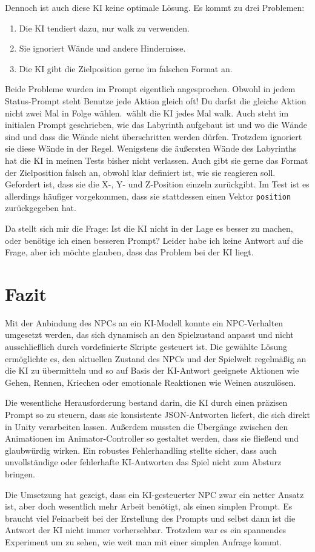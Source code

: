 \documentclass[a4paper]{article}
\begin{document}
Dennoch ist auch diese KI keine optimale Lösung. Es kommt zu drei Problemen:
\begin{enumerate}
	\item Die KI tendiert dazu, nur walk zu verwenden.
	\item Sie ignoriert Wände und andere Hindernisse.
	\item Die KI gibt die Zielposition gerne im falschen Format an.
\end{enumerate}
Beide Probleme wurden im Prompt eigentlich angesprochen. Obwohl in jedem Status-Prompt steht \glqq Benutze jede Aktion gleich oft! Du darfst die gleiche Aktion nicht zwei Mal in Folge wählen.\grqq\ wählt die KI jedes Mal walk. Auch steht im initialen Prompt geschrieben, wie das Labyrinth aufgebaut ist und wo die Wände sind und dass die Wände nicht überschritten werden dürfen. Trotzdem ignoriert sie diese Wände in der Regel. Wenigstens die äußersten Wände des Labyrinths hat die KI in meinen Tests bisher nicht verlassen. Auch gibt sie gerne das Format der Zielposition falsch an, obwohl klar definiert ist, wie sie reagieren soll. Gefordert ist, dass sie die X-, Y- und Z-Position einzeln zurückgibt. Im Test ist es allerdings häufiger vorgekommen, dass sie stattdessen einen Vektor \texttt{position} zurückgegeben hat.

Da stellt sich mir die Frage: Ist die KI nicht in der Lage es besser zu machen, oder benötige ich einen besseren Prompt? Leider habe ich keine Antwort auf die Frage, aber ich möchte glauben, dass das Problem bei der KI liegt.

\section{Fazit}
Mit der Anbindung des NPCs an ein KI-Modell konnte ein NPC-Verhalten umgesetzt werden, das sich dynamisch an den Spielzustand anpasst und nicht ausschließlich durch vordefinierte Skripte gesteuert ist. Die gewählte Lösung ermöglichte es, den aktuellen Zustand des NPCs und der Spielwelt regelmäßig an die KI zu übermitteln und so auf Basis der KI-Antwort geeignete Aktionen wie Gehen, Rennen, Kriechen oder emotionale Reaktionen wie Weinen auszulösen.

Die wesentliche Herausforderung bestand darin, die KI durch einen präzisen Prompt so zu steuern, dass sie konsistente JSON-Antworten liefert, die sich direkt in Unity verarbeiten lassen. Außerdem mussten die Übergänge zwischen den Animationen im Animator-Controller so gestaltet werden, dass sie fließend und glaubwürdig wirken. Ein robustes Fehlerhandling stellte sicher, dass auch unvollständige oder fehlerhafte KI-Antworten das Spiel nicht zum Absturz bringen.

Die Umsetzung hat gezeigt, dass ein KI-gesteuerter NPC zwar ein netter Ansatz ist, aber doch wesentlich mehr Arbeit benötigt, als einen simplen Prompt. Es braucht viel Feinarbeit bei der Erstellung des Prompts und selbst dann ist die Antwort der KI nicht immer vorhersehbar. Trotzdem war es ein spannendes Experiment um zu sehen, wie weit man mit einer simplen Anfrage kommt.
\end{document}
